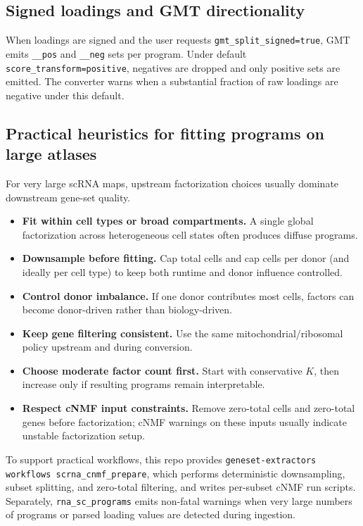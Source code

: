 \documentclass[11pt]{article}
\begin{document}
\subsection*{Signed loadings and GMT directionality}
When loadings are signed and the user requests \texttt{gmt\_split\_signed=true}, GMT emits \texttt{\_\_pos} and \texttt{\_\_neg} sets per program.
Under default \texttt{score\_transform=positive}, negatives are dropped and only positive sets are emitted. The converter warns when a substantial fraction of raw loadings are negative under this default.

\subsection*{Practical heuristics for fitting programs on large atlases}
For very large scRNA maps, upstream factorization choices usually dominate downstream gene-set quality.
\begin{itemize}[leftmargin=2em]
\item \textbf{Fit within cell types or broad compartments.} A single global factorization across heterogeneous cell states often produces diffuse programs.
\item \textbf{Downsample before fitting.} Cap total cells and cap cells per donor (and ideally per cell type) to keep both runtime and donor influence controlled.
\item \textbf{Control donor imbalance.} If one donor contributes most cells, factors can become donor-driven rather than biology-driven.
\item \textbf{Keep gene filtering consistent.} Use the same mitochondrial/ribosomal policy upstream and during conversion.
\item \textbf{Choose moderate factor count first.} Start with conservative $K$, then increase only if resulting programs remain interpretable.
\item \textbf{Respect cNMF input constraints.} Remove zero-total cells and zero-total genes before factorization; cNMF warnings on these inputs usually indicate unstable factorization setup.
\end{itemize}
To support practical workflows, this repo provides \texttt{geneset-extractors workflows scrna\_cnmf\_prepare}, which performs deterministic downsampling, subset splitting, and zero-total filtering, and writes per-subset cNMF run scripts. Separately, \texttt{rna\_sc\_programs} emits non-fatal warnings when very large numbers of programs or parsed loading values are detected during ingestion.
\end{document}
